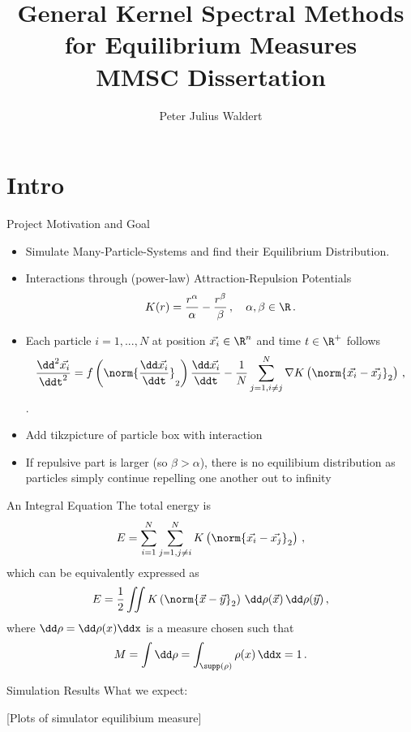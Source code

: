 \documentclass[aspectratio=169,hyperref={colorlinks=true}]{beamer}
\title{General Kernel Spectral Methods for Equilibrium Measures \\ \normalsize MMSC Dissertation}
\author{Peter Julius Waldert}
\institute{Mathematical Institute \\ University of Oxford}
\date{} %
\begin{document}
  {\frame{\titlepage}}

  \section{Intro}
  \begin{frame}{Project Motivation and Goal}
    \begin{itemize}
      \item Simulate Many-Particle-Systems and find their Equilibrium Distribution.
      \item Interactions through (power-law) Attraction-Repulsion Potentials
            $$K(r) = \frac{r^\alpha}{\alpha} - \frac{r^\beta}{\beta}\,,\quad \alpha, \beta \in \R\,.$$
      \item Each particle $i=1, ..., N$ at position $\vec{x_i} \in \R^n$ and time $t \in \R^+$ follows
            $$\frac{\dd^2 \vec{x_i}}{\ddt^2} = f\left(\norm{\frac{\dd \vec{x_i}}{\ddt}}_2\right) \frac{\dd\vec{x_i}}{\ddt} - \frac{1}{N} \sum_{j=1, i\neq j}^{N} \nabla K\left(\norm{\vec{x_i} - \vec{x_j}}_2\right)\,,$$
            \parencite{2020-power-law-kernels, 2021-arbitrary-dimensions}.
      \item Add tikzpicture of particle box with interaction
      \item If repulsive part is larger (so $\beta > \alpha$), there is no equilibium distribution as particles simply continue repelling one another out to infinity
    \end{itemize}
  \end{frame}

  \begin{frame}{An Integral Equation}
    The total energy is $$E = \sum_{i=1}^{N} \sum_{j=1, j \neq i}^{N} K\left(\norm{\vec{x_i} - \vec{x_j}}_2\right)\,,$$
    which can be equivalently expressed as
    $$E = \frac{1}{2} \iint K\left(\norm{\vec{x} - \vec{y}}_2\right) \,\dd\rho(\vec{x})\,\dd\rho(\vec{y})\,,$$ where $\dd\rho = \dd\rho(x)\ddx$ is a measure chosen such that $$M = \int \dd\rho = \int_{\supp(\rho)} \rho(x) \,\ddx = 1\,.$$
  \end{frame}

  \begin{frame}{Simulation Results}
    What we expect:

    [Plots of simulator equilibium measure]
  \end{frame}
\end{document}
